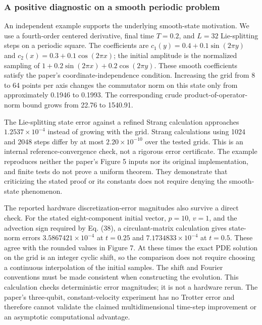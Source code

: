 \subsubsection{A positive diagnostic on a smooth periodic
problem}\label{a-positive-diagnostic-on-a-smooth-periodic-problem}

An independent example supports the underlying smooth-state motivation.
We use a fourth-order centered derivative, final time \(T=0.2\), and
\(L=32\) Lie-splitting steps on a periodic square. The coefficients are
\(c_1(y)=0.4+0.1\sin(2\pi y)\) and \(c_2(x)=0.3+0.1\cos(2\pi x)\); the
initial amplitude is the normalized sampling of
\(1+0.2\sin(2\pi x)+0.2\cos(2\pi y)\). These smooth coefficients satisfy
the paper's coordinate-independence condition. Increasing the grid from
8 to 64 points per axis changes the commutator norm on this state only
from approximately 0.1946 to 0.1993. The corresponding crude
product-of-operator-norm bound grows from 22.76 to 1540.91.

The Lie-splitting state error against a refined Strang calculation
approaches \(1.2537\times10^{-4}\) instead of growing with the grid.
Strang calculations using 1024 and 2048 steps differ by at most
\(2.20\times10^{-10}\) over the tested grids. This is an internal
reference-convergence check, not a rigorous error certificate. The
example reproduces neither the paper's Figure 5 inputs nor its original
implementation, and finite tests do not prove a uniform theorem. They
demonstrate that criticizing the stated proof or its constants does not
require denying the smooth-state phenomenon.

The reported hardware discretization-error magnitudes also survive a
direct check. For the stated eight-component initial vector, \(p=10\),
\(v=1\), and the advection sign required by Eq. (38), a circulant-matrix
calculation gives state-norm errors \(3.5867421\times10^{-4}\) at
\(t=0.25\) and \(7.1734833\times10^{-4}\) at \(t=0.5\). These agree with
the rounded values in Figure 7. At these times the exact PDE solution on
the grid is an integer cyclic shift, so the comparison does not require
choosing a continuous interpolation of the initial samples. The shift
and Fourier conventions must be made consistent when constructing the
evolution. This calculation checks deterministic error magnitudes; it is
not a hardware rerun. The paper's three-qubit, constant-velocity
experiment has no Trotter error and therefore cannot validate the
claimed multidimensional time-step improvement or an asymptotic
computational advantage.

